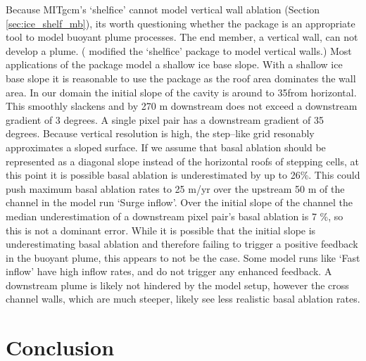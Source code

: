 Because MITgcm's `shelfice' cannot model vertical wall ablation (Section \ref{sec:ice_shelf_mb}), its worth questioning whether the package is an appropriate tool to model buoyant plume processes. The end member, a vertical wall, can not develop a plume. (\cite{xu2012numerical} modified the `shelfice' package to model vertical walls.) Most applications of the package \citep[e.g.][]{goldberg2019accurately,schodlok2012sensitivity} model a shallow ice base slope. With a shallow ice base slope it is reasonable to use the package as the roof area dominates the wall area. In our domain the initial slope of the cavity is around to 35\textdegree from horizontal. This smoothly slackens and by 270 m downstream  does not exceed a downstream gradient of 3 degrees. A single pixel pair has a downstream gradient of 35 degrees. Because vertical resolution is high, the step--like grid resonably approximates a sloped surface. If we assume that  basal ablation should be represented as a diagonal slope instead of the horizontal roofs of stepping cells, at this point it is possible basal ablation is underestimated by up to 26\%. This could push maximum basal ablation rates to 25 m/yr over the upstream 50 m of the channel in the model run `Surge inflow'. Over the initial slope of the channel the median underestimation of a downstream pixel pair's basal ablation is 7 \%, so this is not a dominant error. While it is possible that the initial slope is underestimating basal ablation and therefore failing to trigger a positive feedback in the buoyant plume, this appears to not be the case. Some model runs like `Fast inflow' have high inflow rates, and do not trigger any enhanced feedback. A downstream plume is likely not hindered by the model setup, however the cross channel walls, which are much steeper, likely see less realistic basal ablation rates. 


\section{Conclusion}

